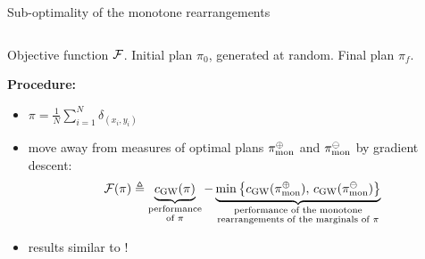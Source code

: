 \documentclass[9pt,xcolor={dvipsnames}]{beamer}
\begin{document}
\begin{frame}{Sub-optimality of the monotone rearrangements}
    \begin{columns}
        \begin{column}[b]{.3\linewidth}
            
            \vspace{-8mm}
        \end{column}
        \begin{column}[b]{.3\linewidth}
            
            \vspace{-8mm}
        \end{column}
        \begin{column}[b]{.3\linewidth}
            \centering
            
            \vspace{-8mm}
        \end{column}
    \end{columns}
    \begin{center}
        {\small\capleft Objective function $\mathcal{F}$. \capcenter Initial plan $\pi_0$, generated at random. \capright Final plan $\pi_f$.}
    \end{center}
    \textbf{Procedure:}
    \begin{itemize}
        \item ${\pi=\frac{1}{N}\sum_{i=1}^{N}\delta_{(x_{i},y_{i})}}$
        \item move away from measures of optimal plans $\pi_\text{mon}^\oplus$ and $\pi_\text{mon}^\ominus$ by gradient descent:
        $$\mathcal{F}(\pi)\triangleq \underbrace{c_{\operatorname{GW}}(\pi)}_{\substack{\text{performance}\\\text{of }\pi}}-\underbrace{\min \left\{ c_{\operatorname{GW}}(\pi_\text{mon}^\oplus),\, c_{\operatorname{GW}}(\pi_\text{mon}^\ominus)\right\}}_{\substack{\text{performance of the monotone}\\\text{rearrangements of the marginals of }\pi}}$$
        \item results similar to \cite{beinert2022assignment}! \light{\faPencil*}
    \end{itemize}
\end{frame}
\end{document}
